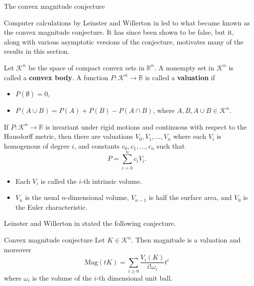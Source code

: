 \documentclass[12pt]{beamer}
\begin{document}
\begin{frame}[allowframebreaks]{The convex magnitude conjecture}

Computer calculations by Leinster and Willerton in \cite{leinster_asymptotic_2013} led to what became known as the convex magnitude conjecture. It has since been shown to be false, but it, along with various asymptotic versions of the conjecture, motivates many of the results in this section.

\begin{definition}
Let $\mathcal{K}^n$ be the space of compact convex sets in $\mathbb{R}^n$. A nonempty set in $\mathcal{K}^n$ is called a \textbf{convex body}. A function $P:\mathcal{K}^n \to \mathbb{R}$ is called a \textbf{valuation} if
\begin{itemize}
\item $P(\emptyset) = 0$,
\item $P(A\cup B) = P(A) + P(B) - P(A\cap B)$, where $A,B, A\cup B \in \mathcal{K}^n$.
\end{itemize}
\end{definition}

\framebreak

\begin{theorem}
If $P:\mathcal{K}^n \to \mathbb{R}$ is invariant under rigid motions and continuous with respect to the Hausdorff metric, then there are valuations $V_0,V_1,\dots,V_n$ where each $V_i$ is homogenous of degree $i$, and constants $c_0,c_1,\dots,c_n$ such that
\begin{equation*}
P = \sum\limits_{i=0}^n c_i V_i.
\end{equation*}
\end{theorem}

\begin{itemize}
\item Each $V_i$ is called the $i$-th intrinsic volume.
\item $V_n$ is the usual $n$-dimensional volume, $V_{n-1}$ is half the surface area, and $V_0$ is the Euler characteristic.
\end{itemize}

\framebreak

Leinster and Willerton in \cite{leinster_asymptotic_2013} stated the following conjecture.

\begin{block}{Convex magnitude conjecture}
Let $K \in \mathcal{K}^n$. Then magnitude is a valuation and moreover
\begin{equation*}
\text{Mag}(tK) = \sum\limits_{i\geq0}\frac{V_i(K)}{i!\omega_i}t^i
\end{equation*}
where $\omega_i$ is the volume of the $i$-th dimensional unit ball.
\end{block}


\end{frame}
\end{document}
